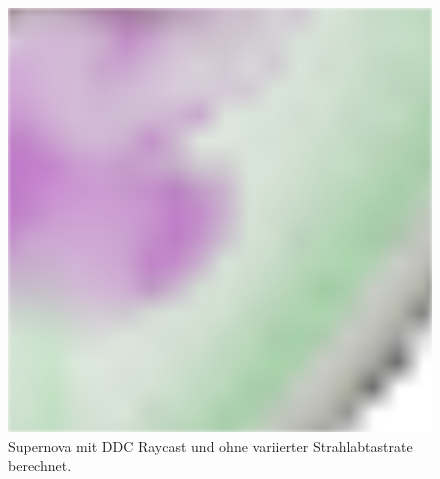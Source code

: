\begin{figure}[]
\begin{minipage}[t]{0.3\textwidth}
	\end{minipage}
	\hfill
	\begin{minipage}[t]{0.3\textwidth}
		\centering
		\includegraphics[width=1\textwidth]{../../Neue_Messungen/Supernova/cut/ddc/ddc_3.png}
	\end{minipage}
	\caption{Supernova mit DDC Raycast und ohne variierter Strahlabtastrate berechnet.}
	\label{fig::res::sn_comp_ddc}
\end{figure}

